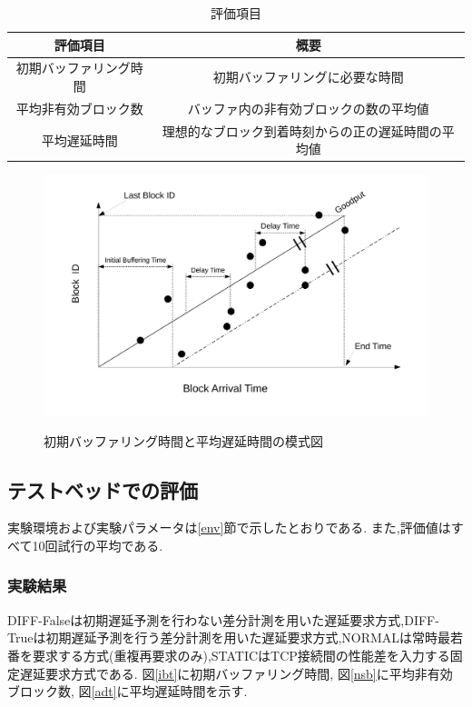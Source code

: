 \documentclass[a4j,12pt]{gradthesis_utf8}
\begin{document}
\newpage

\begin{table}[htb]
	\begin{center}
		\caption{評価項目}
		\label{hyoka}
		\begin{tabular}{|c|c|} \hline
			評価項目 & 概要　\\ \hline \hline
			初期バッファリング時間 & 初期バッファリングに必要な時間 \\ \hline
			平均非有効ブロック数 & バッファ内の非有効ブロックの数の平均値 \\ \hline
			平均遅延時間 & 理想的なブロック到着時刻からの正の遅延時間の平均値 \\ \hline
		\end{tabular}
	\end{center}
\end{table}

\begin{figure}[ht]
	\begin{center}
		\label{buf}
		\includegraphics[width=17cm]{figure/initialBuffering.pdf}
		\caption{初期バッファリング時間と平均遅延時間の模式図}
	\end{center}
\end{figure}

\clearpage

\subsection{テストベッドでの評価}
実験環境および実験パラメータは\ref{env}節で示したとおりである.
また,評価値はすべて10回試行の平均である.

\subsubsection{実験結果}
DIFF-Falseは初期遅延予測を行わない差分計測を用いた遅延要求方式,DIFF-Trueは初期遅延予測を行う差分計測を用いた遅延要求方式,NORMALは常時最若番を要求する方式(重複再要求のみ),STATICはTCP接続間の性能差を入力する固定遅延要求方式である.
図\ref{ibt}に初期バッファリング時間,
図\ref{nsb}に平均非有効ブロック数,
図\ref{adt}に平均遅延時間を示す.
\end{document}
